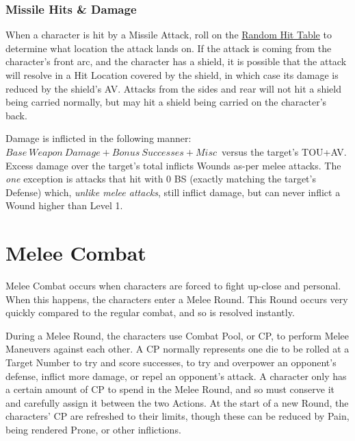 \documentclass[oneside,11pt,english]{book}
\begin{document}
\subsubsection{Missile Hits \& Damage}
When a character is hit by a Missile Attack, roll on the \hyperref[tab:Missile Target Zones]{Random Hit Table} to determine what location the 
attack lands on. If the attack is coming from the character’s front arc, and the character has a shield, it is possible that the attack will resolve in a Hit Location covered by the shield, in which case its damage is
reduced by the shield’s AV. Attacks from the sides and rear will not hit a shield being carried normally,
but may hit a shield being carried on the character’s back.

Damage is inflicted in the following manner: $ Base~Weapon~Damage+Bonus~Successes+Misc $~versus the target’s TOU+AV. Excess damage over the target’s total inflicts Wounds as-per melee attacks. The \emph{one} exception is attacks that hit with 0 BS (exactly matching the target’s Defense) which, \emph{unlike melee attacks}, still inflict damage, but can never inflict a Wound higher than Level 1.

\section{Melee Combat}
Melee Combat occurs when characters are forced to fight up-close and personal. When this happens, the characters enter a Melee Round. This Round occurs very quickly compared to the regular combat, and so is resolved instantly.

During a Melee Round, the characters use Combat Pool, or CP, to perform Melee Maneuvers against each other. A CP normally represents one die to be rolled at a Target Number to try and score successes, to try and overpower an opponent’s defense, inflict more damage, or repel an opponent’s attack. A character only has a certain amount of CP to spend in the Melee Round, and so must conserve it and carefully assign it between the two Actions. At the start of a new Round, the characters’ CP are refreshed to their limits, though these can be reduced by Pain, being rendered Prone, or other inflictions.
\end{document}
